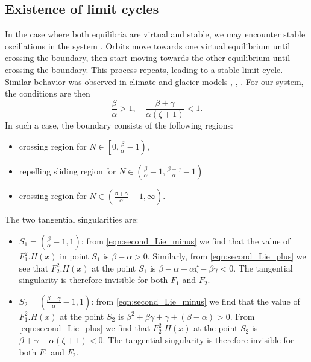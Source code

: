 \documentclass[12pt,a4paper]{article}
\begin{document}
\subsection{Existence of limit cycles}
In the case where both equilibria are virtual and stable, we may encounter stable oscillations in the system \cite{simpson2025nonsmooth}. Orbits move towards one virtual equilibrium until crossing the boundary, then start moving towards the other equilibrium until crossing the boundary. This process repeats, leading to a stable limit cycle. Similar behavior was observed in climate and glacier models \cite{morupisi2021analysis}, \cite{walsh2016periodic}, \cite{walsh2020discontinuous}. For our system, the conditions are then
\begin{equation}\label{eqn:ConditionsOsc}
    \frac{\beta}{\alpha} > 1, \quad \frac{\beta + \gamma}{\alpha (\zeta + 1)} < 1.
\end{equation}
In such a case, the boundary consists of the following regions:
\begin{itemize}
    \item crossing region for $N \in \left[0, \frac{\beta}{\alpha} - 1\right)$,
    \item repelling sliding region for $N \in \left(\frac{\beta}{\alpha} - 1, \frac{\beta + \gamma}{\alpha} -1\right)$
    \item crossing region for $N \in \left(\frac{\beta + \gamma}{\alpha} - 1, \infty\right)$.
\end{itemize}
The two tangential singularities are:
\begin{itemize}
    \item $S_1 = \left(\frac{\beta}{\alpha} - 1, 1 \right)$: from \eqref{eqn:second_Lie_minus} we find that the value of $F_1^{2}.H(x)$ in point $S_1$ is $\beta - \alpha > 0$.  Similarly, from \eqref{eqn:second_Lie_plus} we see that $F_2^{2}.H(x)$ at the point $S_1$ is $\beta - \alpha - \alpha \zeta - \beta \gamma < 0$. The tangential singularity is therefore invisible for both $F_1$ and $F_2$.
    \item $S_2 = \left(\frac{\beta + \gamma}{\alpha} - 1, 1 \right)$: from \eqref{eqn:second_Lie_minus} we find that the value of $F_1^{2}.H(x)$ at the point $S_2$ is $\beta^2 + \beta \gamma + \gamma + (\beta - \alpha) > 0.$ From \eqref{eqn:second_Lie_plus} we find that $F_2^{2}.H(x)$ at the point $S_2$ is $\beta + \gamma - \alpha (\zeta + 1) < 0$. The tangential singularity is therefore invisible for both $F_1$ and $F_2$.
\end{itemize}
\end{document}
